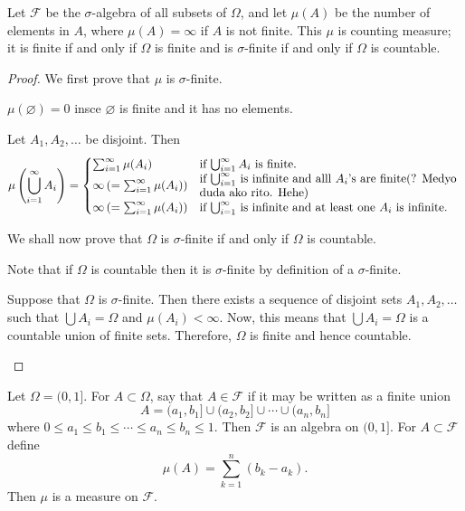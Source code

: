 \begin{example}
Let $\mathcal F$ be the $\sigma$-algebra of all subsets of $\Omega$, and let $\mu(A)$ be the
number of elements in $A$, where $\mu(A)=\infty$ if $A$ is not finite. This $\mu$ is counting 
measure; it is finite if and only if $\Omega$ is finite and is $\sigma$-finite if and only if 
$\Omega$ is countable.
\end{example}

\begin{proof}
We first prove that $\mu$ is $\sigma$-finite.

\begin{prooflist}
\item $\mu(\varnothing)=0$ insce $\varnothing$ is finite and it has no elements.
\item Let $A_1, A_2, \ldots$ be disjoint. Then
\begin{equation*}
\mu\left(\bigcup_{i=1}^\infty A_i \right)=
	\begin{cases}
	\sum_{i=1}^{\infty} \mu(A_i) & \text{if $\bigcup_{i=1}^\infty A_i$ is finite.}\\
	\infty\left(=\sum_{i=1}^{\infty}\mu(A_i)\right) & \text{%
		\begin{minipage}{3in}
		if $\bigcup_{i=1}^\infty$ is infinite and alll $A_i$'s are finite(? Medyo duda ako rito. Hehe)
		\end{minipage}
		}\\
	\infty\left(=\sum_{i=1}^{\infty} \mu(A_i) \right) & \text{if $\bigcup_{i=1}^\infty$ is infinite and at least one $A_i$ is infinite.}
	\end{cases}
\end{equation*}

We shall now prove that $\Omega$ is $\sigma$-finite if and only if $\Omega$ is countable.

Note that if $\Omega$ is countable then it is $\sigma$-finite by definition of a $\sigma$-finite.

Suppose that $\Omega$ is $\sigma$-finite. Then there exists a sequence of disjoint sets $A_1, A_2, \ldots$ such that $\bigcup A_i=\Omega$ and $\mu(A_i)<\infty$. Now, this means that $\bigcup A_i=\Omega$ is a countable union of finite sets. Therefore, $\Omega$ is finite and hence countable.

\end{prooflist}
\end{proof}

\begin{example}
Let $\Omega=(0,1]$. For $A\subset \Omega$, say that $A\in \mathcal F$ if it may be written as a 
finite union
\begin{equation*}
A=(a_1,b_1]\cup (a_2,b_2]\cup \cdots \cup (a_n,b_n]
\end{equation*}
where $0\leq a_1\leq b_1\leq \cdots \leq a_n\leq b_n\leq 1$. Then $\mathcal F$ is an algebra
on $(0,1]$. For $A\subset \mathcal F$ define
\begin{equation*}
\mu(A)=\sum_{k=1}^{n}(b_k-a_k).
\end{equation*}
Then $\mu$ is a measure on $\mathcal F$.
\end{example}

